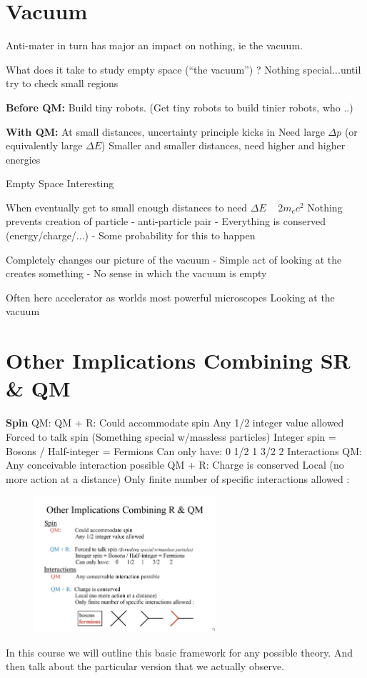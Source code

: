 \section{Vacuum}
Anti-mater in turn has major an impact on nothing, ie the vacuum.

What does it take to study empty space (“the vacuum”) ?
Nothing special...until try to check small regions

\textbf{Before QM:}
Build tiny robots. (Get tiny robots to build tinier robots, who ..)

\textbf{With QM:}
At small distances, uncertainty principle kicks in
Need large $\Delta p$ (or equivalently large $\Delta E$)
Smaller and smaller distances, need higher and higher energies


Empty Space Interesting

When eventually get to small enough distances to need $\Delta E$ ~ 2$m_e c^2$
Nothing prevents creation of particle - anti-particle pair
- Everything is conserved (energy/charge/...) - Some probability for this to happen

Completely changes our picture of the vacuum
- Simple act of looking at the creates something - No sense in which the vacuum is empty

Often here accelerator as worlds most powerful microscopes
Looking at the vacuum


\section{Other Implications Combining SR \& QM}

\textbf{Spin}
QM: QM + R:
 Could accommodate spin
Any 1/2 integer value allowed
Forced to talk spin (Something special w/massless particles) Integer spin = Bosons / Half-integer = Fermions Can only have: 0 1/2 1 3/2 2
Interactions
QM: Any conceivable interaction possible
QM + R: Charge is conserved
Local (no more action at a distance)
Only finite number of specific interactions allowed :
\begin{figure}[h]
\centering
\includegraphics[width=0.6\textwidth]{./AllowedInteractions.pdf}
\end{figure}


In this course we will outline this basic framework for any possible theory.
And then talk about the particular version that we actually observe.





